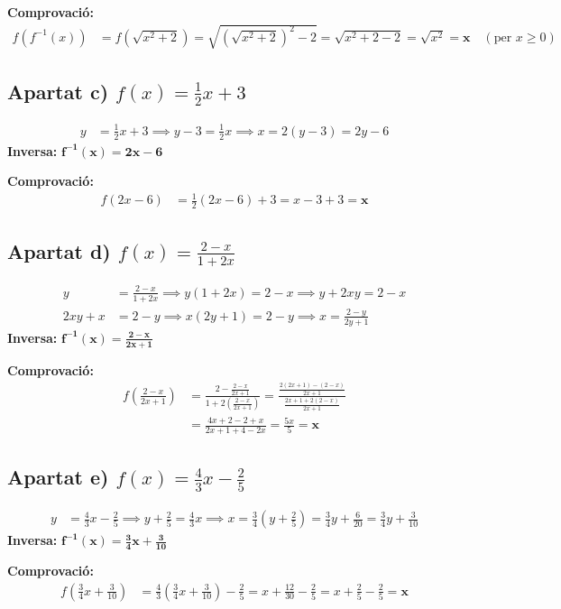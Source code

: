 \documentclass[12pt,a4paper]{article}
\begin{document}
\textbf{Comprovació:}
\begin{align*}
f(f^{-1}(x)) &= f\left(\sqrt{x^2 + 2}\right) = \sqrt{\left(\sqrt{x^2 + 2}\right)^2 - 2} = \sqrt{x^2 + 2 - 2} = \sqrt{x^2} = \mathbf{x} \quad (\text{per } x \ge 0)
\end{align*}

\subsection{Apartat c) $f(x) = \frac{1}{2}x + 3$}
\begin{align*}
y &= \frac{1}{2}x + 3 \implies y - 3 = \frac{1}{2}x \implies x = 2(y - 3) = 2y - 6
\end{align*}
\textbf{Inversa:} $\mathbf{f^{-1}(x) = 2x - 6}$

\textbf{Comprovació:}
\begin{align*}
f(2x - 6) &= \frac{1}{2}(2x - 6) + 3 = x - 3 + 3 = \mathbf{x}
\end{align*}

\subsection{Apartat d) $f(x) = \frac{2 - x}{1 + 2x}$}
\begin{align*}
y &= \frac{2 - x}{1 + 2x} \implies y(1 + 2x) = 2 - x \implies y + 2xy = 2 - x \\
2xy + x &= 2 - y \implies x(2y + 1) = 2 - y \implies x = \frac{2 - y}{2y + 1}
\end{align*}
\textbf{Inversa:} $\mathbf{f^{-1}(x) = \frac{2 - x}{2x + 1}}$

\textbf{Comprovació:}
\begin{align*}
f\left(\frac{2 - x}{2x + 1}\right) &= \frac{2 - \frac{2 - x}{2x + 1}}{1 + 2\left(\frac{2 - x}{2x + 1}\right)} = \frac{\frac{2(2x + 1) - (2 - x)}{2x + 1}}{\frac{2x + 1 + 2(2 - x)}{2x + 1}} \\
&= \frac{4x + 2 - 2 + x}{2x + 1 + 4 - 2x} = \frac{5x}{5} = \mathbf{x}
\end{align*}

\subsection{Apartat e) $f(x) = \frac{4}{3}x - \frac{2}{5}$}
\begin{align*}
y &= \frac{4}{3}x - \frac{2}{5} \implies y + \frac{2}{5} = \frac{4}{3}x \implies x = \frac{3}{4}\left(y + \frac{2}{5}\right) = \frac{3}{4}y + \frac{6}{20} = \frac{3}{4}y + \frac{3}{10}
\end{align*}
\textbf{Inversa:} $\mathbf{f^{-1}(x) = \frac{3}{4}x + \frac{3}{10}}$

\textbf{Comprovació:}
\begin{align*}
f\left(\frac{3}{4}x + \frac{3}{10}\right) &= \frac{4}{3}\left(\frac{3}{4}x + \frac{3}{10}\right) - \frac{2}{5} = x + \frac{12}{30} - \frac{2}{5} = x + \frac{2}{5} - \frac{2}{5} = \mathbf{x}
\end{align*}
\end{document}
